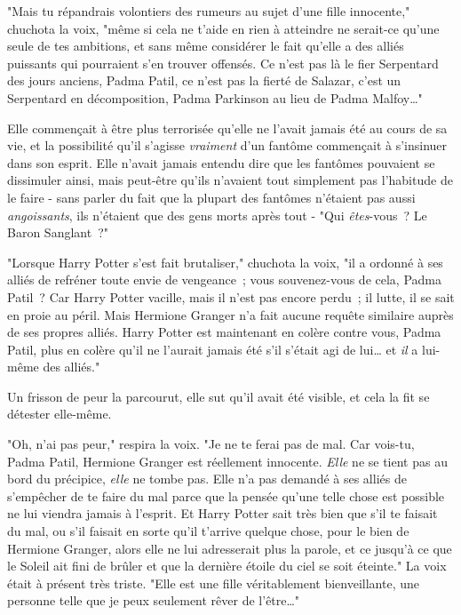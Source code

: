 "Mais tu répandrais volontiers des rumeurs au sujet d'une fille innocente," chuchota la voix, "même si cela ne t'aide en rien à atteindre ne serait-ce qu'une seule de tes ambitions, et sans même considérer le fait qu'elle a des alliés puissants qui pourraient s'en trouver offensés. Ce n'est pas là le fier Serpentard des jours anciens, Padma Patil, ce n'est pas la fierté de Salazar, c'est un Serpentard en décomposition, Padma Parkinson au lieu de Padma Malfoy…"

Elle commençait à être plus terrorisée qu'elle ne l'avait jamais été au cours de sa vie, et la possibilité qu'il s'agisse \emph{vraiment} d'un fantôme commençait à s'insinuer dans son esprit. Elle n'avait jamais entendu dire que les fantômes pouvaient se dissimuler ainsi, mais peut-être qu'ils n'avaient tout simplement pas l'habitude de le faire - sans parler du fait que la plupart des fantômes n'étaient pas aussi \emph{angoissants}, ils n'étaient que des gens morts après tout - "Qui \emph{êtes}-vous~? Le Baron Sanglant~?"

"Lorsque Harry Potter s'est fait brutaliser," chuchota la voix, "il a ordonné à ses alliés de refréner toute envie de vengeance~; vous souvenez-vous de cela, Padma Patil~? Car Harry Potter vacille, mais il n'est pas encore perdu~; il lutte, il se sait en proie au péril. Mais Hermione Granger n'a fait aucune requête similaire auprès de ses propres alliés. Harry Potter est maintenant en colère contre vous, Padma Patil, plus en colère qu'il ne l'aurait jamais été s'il s'était agi de lui… et \emph{il} a lui-même des alliés."

Un frisson de peur la parcourut, elle sut qu'il avait été visible, et cela la fit se détester elle-même.

"Oh, n'ai pas peur," respira la voix. "Je ne te ferai pas de mal. Car vois-tu, Padma Patil, Hermione Granger est réellement innocente. \emph{Elle} ne se tient pas au bord du précipice, \emph{elle} ne tombe pas. Elle n'a pas demandé à ses alliés de s'empêcher de te faire du mal parce que la pensée qu'une telle chose est possible ne lui viendra jamais à l'esprit. Et Harry Potter sait très bien que s'il te faisait du mal, ou s'il faisait en sorte qu'il t'arrive quelque chose, pour le bien de Hermione Granger, alors elle ne lui adresserait plus la parole, et ce jusqu'à ce que le Soleil ait fini de brûler et que la dernière étoile du ciel se soit éteinte." La voix était à présent très triste. "Elle est une fille véritablement bienveillante, une personne telle que je peux seulement rêver de l'être…"

